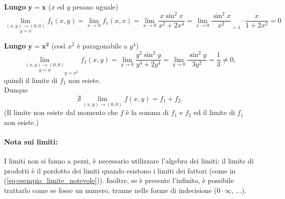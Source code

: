 \begin{example}
	\noindent \textbf{Lungo} $\boldsymbol{y=x}$ ($x$ ed $y$ pesano uguale)
	\begin{equation}\label{eq:esempio_limite_notevole}
			\underset{y=x}{\lim_{(x,y)\rightarrow(0,0)}} f_1(x,y) = \lim_{x\rightarrow 0} f_1(x,x) = \lim_{x\rightarrow 0}\frac{x\sin^2x}{x^2+2x^4} = \lim_{x\rightarrow 0}\boxed{\frac{\sin^2x}{x^2}}_{=1}\cdot\frac{x}{1+2x^2}=0
	\end{equation}
	
	\noindent \textbf{Lungo} $\boldsymbol{y=x^2}$ (così $x^2$ è paragonabile a $y^4$)
	\begin{equation*}
		\underset{y=x}{\lim_{(x,y)\rightarrow(0,0)}}_{y=x^2} f_1(x,y) = \lim_{y\rightarrow 0}\frac{y^2\sin^2y}{y^4+2y^4} = \lim_{y\rightarrow 0} \frac{\sin^2y}{3y^2} =\frac{1}{3} \neq 0,
	\end{equation*}
	quindi il limite di $f_1$ non esiste.\\
	Dunque
	\begin{equation*}
		\nexists \lim_{(x,y)\rightarrow(0,0)} f(x,y) = f_1 + f_2.
	\end{equation*}
	(Il limite non esiste dal momento che $f$ è la somma di $f_1$ e $f_2$ ed il limite di $f_1$ non esiste.)
\end{example}

\paragraph{Nota sui limiti:} I limiti non si fanno a pezzi, è necessario utilizzare l'algebra dei limiti: il limite di prodotti è il pordotto dei limiti quando esistono i limiti dei fattori (come in (\ref{eq:esempio_limite_notevole})). Inoltre, se è presente l'infinito, è possibile trattarlo come se fosse un numero, tranne nelle forme di indecisione ($0\cdot\infty,\, \hdots$).

